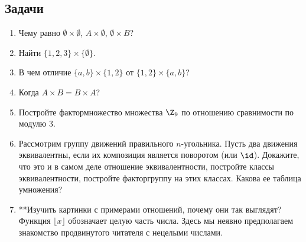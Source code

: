\subsection*{Задачи}
\begin{enumerate}
\item Чему равно $\emptyset\times\emptyset$, $A\times\emptyset$, $\emptyset\times B$?
\item Найти $\{1,2,3\}\times\{\emptyset\}$.
\item В чем отличие $\{a,b\}\times\{1,2\}$ от $\{1,2\}\times\{a,b\}$?
\item Когда $A\times B = B\times A$?
\item Постройте фактормножество множества $\Z_9$ по отношению сравнимости по модулю $3$.
\item Рассмотрим группу движений правильного $n$-угольника. Пусть два движения эквивалентны, если их композиция является поворотом (или $\id$). Докажите, что это и в самом деле отношение эквивалентности, постройте классы эквивалентности, постройте факторгруппу на этих классах. Какова ее таблица умножения?
\item **Изучить картинки с примерами отношений, почему они так выглядят? Функция $\lfloor x\rfloor$ обозначает целую часть числа. Здесь мы неявно предполагаем знакомство продвинутого читателя с нецелыми числами.
\end{enumerate}
